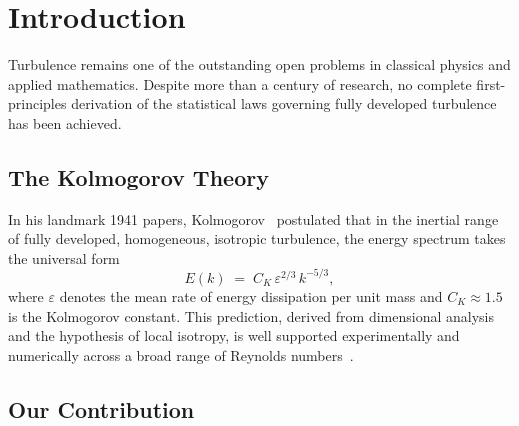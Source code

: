 \documentclass[12pt,a4paper]{article}
\theoremstyle{definition}
\theoremstyle{plain}
\theoremstyle{remark}
\begin{document}
\tableofcontents
\clearpage

\section{Introduction}\label{sec:intro}

Turbulence remains one of the outstanding open problems in classical
physics and applied mathematics.  Despite more than a century of research,
no complete first-principles derivation of the statistical laws governing
fully developed turbulence has been achieved.

\subsection{The Kolmogorov Theory}

In his landmark 1941 papers, Kolmogorov~\cite{K41a,K41b} postulated that
in the inertial range of fully developed, homogeneous, isotropic
turbulence, the energy spectrum takes the universal form
\begin{equation}\label{eq:K41}
  E(k) \;=\; C_K \,\varepsilon^{2/3}\, k^{-5/3},
\end{equation}
where $\varepsilon$ denotes the mean rate of energy dissipation per unit
mass and $C_K \approx 1.5$ is the Kolmogorov constant.  This prediction,
derived from dimensional analysis and the hypothesis of local isotropy,
is well supported experimentally and numerically across a broad range of
Reynolds numbers~\cite{Frisch95,Pope00}.

\subsection{Our Contribution}
\end{document}
